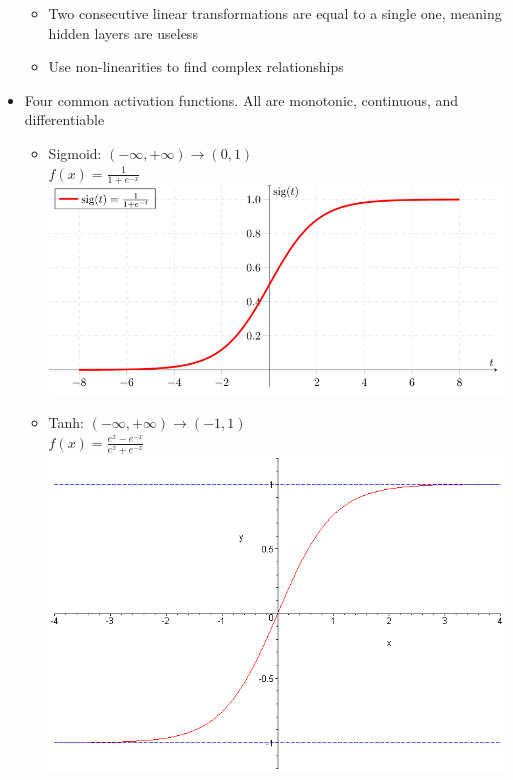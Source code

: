 \documentclass{article}
\begin{document}
\begin{multicols*}{3}
\begin{itemize}[noitemsep]
        \begin{itemize}
            \item Two consecutive linear transformations are equal to a single one,
            meaning hidden layers are useless
            \item Use non-linearities to find complex relationships
        \end{itemize}
        \item Four common activation functions. 
        All are monotonic, continuous, and differentiable
        \begin{itemize}
            \item Sigmoid: $(-\infty,+\infty) \rightarrow (0,1)$ \\
            $f(x) = \frac{1}{1+e^{-x}}$ \\
            \includegraphics[width=\linewidth]{sigmoid_function} \\
            \item Tanh: $(-\infty,+\infty) \rightarrow (-1,1)$ \\
            $f(x) = \frac{e^x-e^{-x}}{e^x+e^{-x}}$ \\
            \includegraphics[width=\linewidth]{tanh_function} \\

\end{itemize}
\end{itemize}
\end{multicols*}
\end{document}
